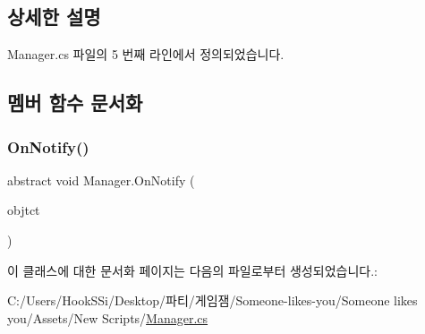 \subsection{상세한 설명}


Manager.\+cs 파일의 5 번째 라인에서 정의되었습니다.



\subsection{멤버 함수 문서화}
\mbox{\label{class_manager_af8f781331eb3451725d6b0a78131de19}} 
\subsubsection{\texorpdfstring{OnNotify()}{OnNotify()}}
{\footnotesize\ttfamily abstract void Manager.\+On\+Notify (\begin{DoxyParamCaption}\item[{Game\+Object}]{objtct }\end{DoxyParamCaption})\hspace{0.3cm}{\ttfamily [pure virtual]}}



이 클래스에 대한 문서화 페이지는 다음의 파일로부터 생성되었습니다.\+:\begin{DoxyCompactItemize}
\item 
C\+:/\+Users/\+Hook\+S\+Si/\+Desktop/파티/게임잼/\+Someone-\/likes-\/you/\+Someone likes you/\+Assets/\+New Scripts/\mbox{\hyperlink{_manager_8cs}{Manager.\+cs}}\end{DoxyCompactItemize}
